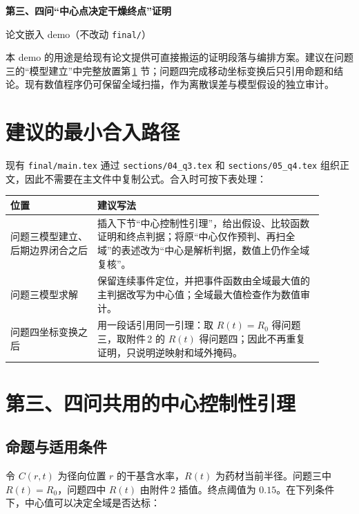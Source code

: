 \documentclass[UTF8,a4paper,fontset=fandol]{ctexart}
\numberwithin{equation}{section}
\newcommand{\crit}{0.15}
\newcommand{\insertnote}[1]{\par\smallskip\noindent\colorbox{light}{\parbox{\dimexpr\linewidth-2\fboxsep\relax}{\small #1}}\par\smallskip}
\begin{document}
\begin{center}
  {\bfseries 第三、四问“中心点决定干燥终点”证明}\par
  \vspace{5pt}
  {\large 论文嵌入 demo（不改动 \texttt{final/}）}
\end{center}

\insertnote{本 demo 的用途是给现有论文提供可直接搬运的证明段落与编排方案。建议在问题三的“模型建立”中完整放置第\,\ref{sec:proof} 节；问题四完成移动坐标变换后只引用命题和结论。现有数值程序仍可保留全域扫描，作为离散误差与模型假设的独立审计。}

\section*{建议的最小合入路径}

现有 \texttt{final/main.tex} 通过 \texttt{sections/04\_q3.tex} 和 \texttt{sections/05\_q4.tex} 组织正文，因此不需要在主文件中复制公式。合入时可按下表处理：

\begin{center}
\begin{tabular}{p{0.25\linewidth}p{0.65\linewidth}}
\toprule
位置 & 建议写法 \\
\midrule
问题三模型建立、后期边界闭合之后 & 插入下节“中心控制性引理”，给出假设、比较函数证明和终点判据；将原“中心仅作预判、再扫全域”的表述改为“中心是解析判据，数值上仍作全域复核”。 \\
问题三模型求解 & 保留连续事件定位，并把事件函数由全域最大值的主判据改写为中心值；全域最大值检查作为数值审计。 \\
问题四坐标变换之后 & 用一段话引用同一引理：取 $R(t)=R_0$ 得问题三，取附件\,2 的 $R(t)$ 得问题四；因此不再重复证明，只说明逆映射和域外掩码。 \\
\bottomrule
\end{tabular}
\end{center}

\section{第三、四问共用的中心控制性引理}\label{sec:proof}

\subsection{命题与适用条件}

令 $C(r,t)$ 为径向位置 $r$ 的干基含水率，$R(t)$ 为药材当前半径。问题三中 $R(t)=R_0$，问题四中 $R(t)$ 由附件\,2 插值。终点阈值为 $\crit$。在下列条件下，中心值可以决定全域是否达标：
\end{document}

